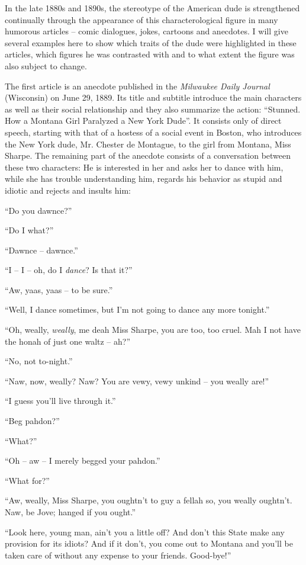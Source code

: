 In the late 1880s and 1890s, the stereotype of the American dude is strengthened continually through the appearance of this characterological figure in many humorous articles – comic dialogues, jokes, cartoons and anecdotes. I will give several examples here to show which traits of the dude were highlighted in these articles, which figures he was contrasted with and to what extent the figure was also subject to change.

The first article is an anecdote published in the \textit{Milwaukee Daily Journal} (Wisconsin) on June 29, 1889. Its title and subtitle introduce the main characters as well as their social relationship and they also summarize the action: “Stunned. How a Montana Girl Paralyzed a New York Dude”. It consists only of direct speech, starting with that of a hostess of a social event in Boston, who introduces the New York dude, Mr. Chester de Montague, to the girl from Montana, Miss Sharpe. The remaining part of the anecdote consists of a conversation between these two characters: He is interested in her and asks her to dance with him, while she has trouble understanding him, regards his behavior as stupid and idiotic and rejects and insults him:

\begin{ipquote}
“Do you dawnce?”

“Do I what?”

“Dawnce – dawnce.”

“I – I – oh, do I \textit{dance}? Is that it?”

“Aw, yaas, yaas – to be sure.”

“Well, I dance sometimes, but I’m not going to dance any more tonight.”

“Oh, weally, \textit{weally}, me deah Miss Sharpe, you are too, too cruel. Mah I not have the honah of just one waltz – ah?”

“No, not to-night.”

“Naw, now, weally? Naw? You are vewy, vewy unkind – you weally are!”

“I guess you’ll live through it.”

“Beg pahdon?”

“What?”

“Oh – aw – I merely begged your pahdon.”

“What for?”

“Aw, weally, Miss Sharpe, you oughtn’t to guy a fellah so, you weally oughtn’t. Naw, be Jove; hanged if you ought.”

“Look here, young man, ain’t you a little off? And don’t this State make any provision for its idiots? And if it don’t, you come out to Montana and you’ll be taken care of without any expense to your friends. Good-bye!”
\end{ipquote}


